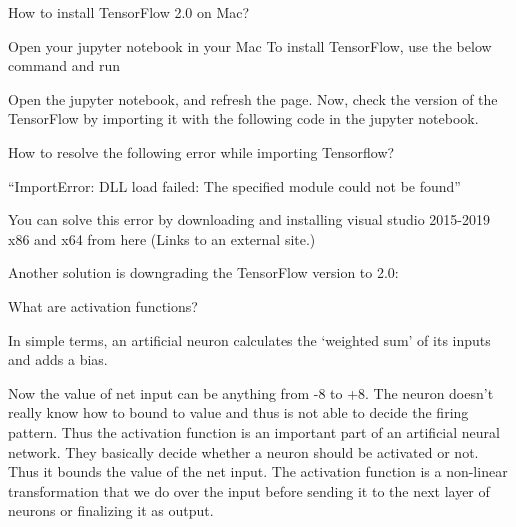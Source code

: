 	\begin{qanda}
		\begin{question}
How to install TensorFlow 2.0 on Mac?
		\end{question}
		\begin{answer}
Open your jupyter notebook in your Mac
To install TensorFlow, use the below command and run

Open the jupyter notebook, and refresh the page. Now, check the version of the TensorFlow by importing it with the following code in the jupyter notebook.
		\end{answer}
	\end{qanda}


	\begin{qanda}
		\begin{question}
How to resolve the following error while importing Tensorflow?
		\end{question}
		\begin{answer}
``ImportError: DLL load failed: The specified module could not be found''

You can solve this error by downloading and installing visual studio 2015-2019 x86 and x64 from here (Links to an external site.)

Another solution is downgrading the TensorFlow version to 2.0:


		\end{answer}
	\end{qanda}
 

	\begin{qanda}
		\begin{question}
What are activation functions?
		\end{question}
		\begin{answer}
In simple terms, an artificial neuron calculates the `weighted sum' of its inputs and adds a bias.

Now the value of net input can be anything from -8 to +8. The neuron doesn't really know how to bound to value and thus is not able to decide the firing pattern. Thus the activation function is an important part of an artificial neural network. They basically decide whether a neuron should be activated or not. Thus it bounds the value of the net input.  The activation function is a non-linear transformation that we do over the input before sending it to the next layer of neurons or finalizing it as output.
		\end{answer}
	\end{qanda}


